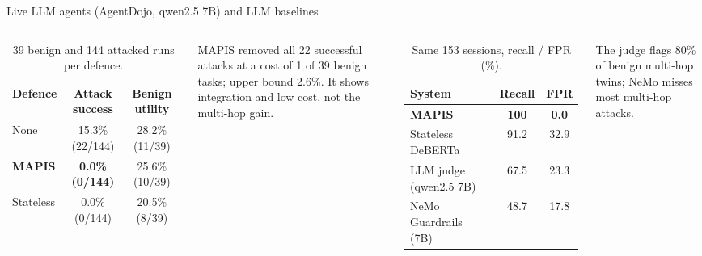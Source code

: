 \documentclass[aspectratio=169,10pt]{beamer}
\begin{document}
\begin{frame}{Live LLM agents (AgentDojo, qwen2.5 7B) and LLM baselines}
  \begin{columns}[T]
    \begin{table}\scriptsize\centering
    \caption{39 benign and 144 attacked runs per defence.}
    \begin{tabular}{lcc}
      \toprule
      Defence & Attack success & Benign utility \\
      \midrule
      None & 15.3\% (22/144) & 28.2\% (11/39) \\
      \textbf{MAPIS} & \textbf{0.0\% (0/144)} & 25.6\% (10/39) \\
      Stateless & 0.0\% (0/144) & 20.5\% (8/39) \\
      \bottomrule
    \end{tabular}
    \end{table}
    {\scriptsize MAPIS removed all 22 successful attacks at a cost of 1 of 39 benign tasks; upper bound 2.6\%. It shows integration and low cost, not the multi-hop gain.}
    \begin{table}\scriptsize\centering
    \caption{Same 153 sessions, recall / FPR (\%).}
    \begin{tabular}{lcc}
      \toprule
      System & Recall & FPR \\
      \midrule
      \textbf{MAPIS} & \textbf{100} & \textbf{0.0} \\
      Stateless DeBERTa & 91.2 & 32.9 \\
      LLM judge (qwen2.5 7B) & 67.5 & 23.3 \\
      NeMo Guardrails (7B) & 48.7 & 17.8 \\
      \bottomrule
    \end{tabular}
    \end{table}
    {\scriptsize The judge flags 80\% of benign multi-hop twins; NeMo misses most multi-hop attacks.}
  \end{columns}
\end{frame}

\end{document}
